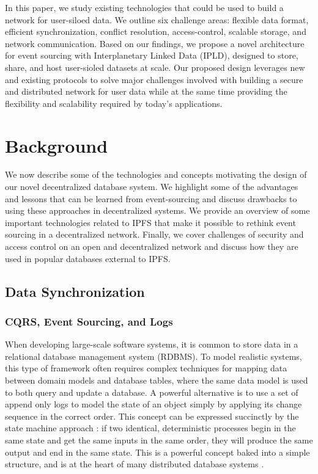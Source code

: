 \documentclass{textile}
\begin{document}
In this paper, we study existing technologies that could be used to build a network for user-siloed data. We outline six challenge areas: flexible data format, efficient synchronization, conflict resolution, access-control, scalable storage, and network communication. Based on our findings, we propose a novel architecture for event sourcing with Interplanetary Linked Data (IPLD), designed to store, share, and host user-sioled datasets at scale. Our proposed design leverages new and existing protocols to solve major challenges involved with building a secure and distributed network for user data while at the same time providing the flexibility and scalability required by today's applications. 


\section{Background}
\label{sec:Background}

We now describe some of the technologies and concepts motivating the design of our novel decentralized database system. We highlight some of the advantages and lessons that can be learned from event-sourcing and discuss drawbacks to using these approaches in decentralized systems. We provide an overview of some important technologies related to IPFS that make it possible to rethink event sourcing in a decentralized network. Finally, we cover challenges of security and access control on an open and decentralized network and discuss how they are used in popular databases external to IPFS. 

\subsection{Data Synchronization}

\subsubsection{CQRS, Event Sourcing, and Logs}

When developing large-scale software systems, it is common to store data in a relational database management system (RDBMS). To model realistic systems, this type of framework often requires complex techniques for mapping data between domain models and database tables, where the same data model is used to both query and update a database. A powerful alternative is to use a set of append only logs to model the state of an object simply by applying its change sequence in the correct order. This concept can be expressed succinctly by the state machine approach \cite{schneiderImplementingFaulttolerantServices1990}: if two identical, deterministic processes begin in the same state and get the same inputs in the same order, they will produce the same output and end in the same state. This is a powerful concept baked into a simple structure, and is at the heart of many distributed database systems \cite{jaykrepsLogWhatEvery2013}.
\end{document}
